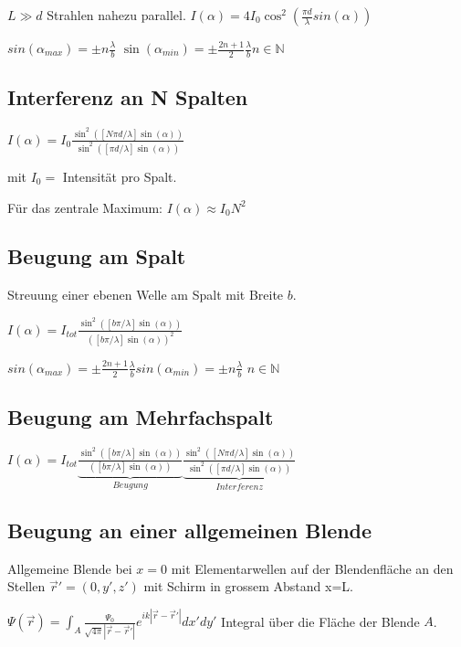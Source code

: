 \documentclass[10pt,a4paper]{scrartcl}
\begin{document}
\begin{multicols*}{3}
	$L\gg d$ \dahe Strahlen nahezu parallel.
		$I(\alpha)=4I_0\cos^2(\frac{\pi d}{\lambda}sin(\alpha))$
	
	$sin(\alpha_{max})=\pm n\frac{\lambda}{b}$ \hfill $\sin(\alpha_{min})=\pm\frac{2n + 1}{2}\frac{\lambda}{b}$\hfill$n\in \mathbb{N}$
	
	\subsection{Interferenz an N Spalten}
		$I(\alpha)=I_0\frac{\sin^2\left([N\pi d/\lambda]\sin(\alpha)\right)}{\sin^2\left([\pi d/\lambda]\sin(\alpha)\right)}$
	
	 mit $I_0=$ Intensität pro Spalt.
	 
	 Für das zentrale Maximum: $I(\alpha)\approx I_0N^2$
	
	\subsection{Beugung am Spalt}
	Streuung einer ebenen Welle am Spalt mit Breite $b$.
	
	$I(\alpha)=I_{tot}\frac{\sin^2\left([b\pi/\lambda]\sin(\alpha)\right)}{\left([b\pi/\lambda]\sin(\alpha)\right)^2}$
	
	$sin(\alpha_{max})=\pm\frac{2n+1}{2}\frac{\lambda}{b}$\hfill	$sin(\alpha_{min})=\pm n\frac{\lambda}{b}$	\hfill $n\in\mathbb{N}$
	
	\subsection{Beugung am Mehrfachspalt}
	
	$I(\alpha)=I_{tot}\underbrace{\frac{\sin^2\left([b\pi/\lambda]\sin(\alpha)\right)}{\left([b\pi/\lambda]\sin(\alpha)\right)}}_{Beugung}\underbrace{\frac{\sin^2\left([N\pi d/\lambda]\sin(\alpha)\right)}{\sin^2\left([\pi d/\lambda]\sin(\alpha)\right)}}_{Interferenz}$	
	
	\subsection{Beugung an einer allgemeinen Blende}
	Allgemeine Blende bei $x=0$ mit Elementarwellen auf der Blendenfläche an den Stellen $\vec{r}'=(0,y',z')$ mit Schirm in grossem Abstand x=L.
	
	\finn	
	
	$\Psi(\vec{r})=\int_A{\frac{\Psi_0}{\sqrt{4\pi}|\vec{r}-\vec{r}'|}e^{ik|\vec{r}-\vec{r}'|}dx'dy'}$ \hfill Integral über die Fläche der Blende $A$.
	

\end{multicols*}
\end{document}
